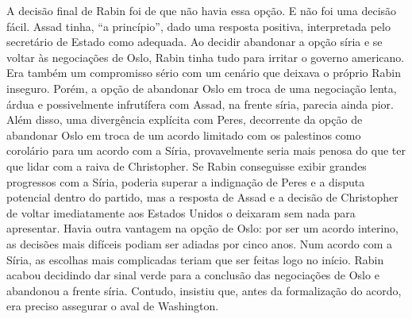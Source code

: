A decisão final de Rabin foi de que não havia essa opção. E não foi uma
decisão fácil. Assad tinha, ``a princípio'', dado uma resposta positiva,
interpretada pelo secretário de Estado como adequada. Ao decidir
abandonar a opção síria e se voltar às negociações de Oslo, Rabin tinha
tudo para irritar o governo americano. Era também um compromisso sério
com um cenário que deixava o próprio Rabin inseguro. Porém, a opção de
abandonar Oslo em troca de uma negociação lenta, árdua e possivelmente
infrutífera com Assad, na frente síria, parecia ainda pior. Além disso,
uma divergência explícita com Peres, decorrente da opção de abandonar
Oslo em troca de um acordo limitado com os palestinos como corolário
para um acordo com a Síria, provavelmente seria mais penosa do que ter
que lidar com a raiva de Christopher. Se Rabin conseguisse exibir
grandes progressos com a Síria, poderia superar a indignação de Peres e
a disputa potencial dentro do partido, mas a resposta de Assad e a
decisão de Christopher de voltar imediatamente aos Estados Unidos o
deixaram sem nada para apresentar. Havia outra vantagem na opção de
Oslo: por ser um acordo interino, as decisões mais difíceis podiam ser
adiadas por cinco anos. Num acordo com a Síria, as escolhas mais
complicadas teriam que ser feitas logo no início. Rabin acabou decidindo
dar sinal verde para a conclusão das negociações de Oslo e abandonou a
frente síria. Contudo, insistiu que, antes da formalização do acordo, era
preciso assegurar o aval de Washington.

